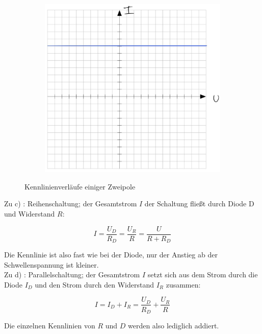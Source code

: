 \begin{figure}[H]
\begin{subfigure}[b]{0.45\textwidth}
        \caption{}
        \label{fig:VA_C_e}
    \end{subfigure}
    \hfill
    \begin{subfigure}[b]{0.45\textwidth}
        \includegraphics[width=\textwidth]{Voraufgaben/Cf.jpg}
        \caption{}
        \label{fig:VA_C_f}
    \end{subfigure}
    \caption{Kennlinienverläufe einiger Zweipole}
\end{figure}



Zu c) : Reihenschaltung; der Gesamtstrom $I$ der Schaltung fließt durch Diode D und Widerstand $R$:

\[
I = \frac{U_D}{R_D} = \frac{U_R}{R} = \frac{U}{R + R_D}
\]

Die Kennlinie ist also fast wie bei der Diode, nur der Anstieg ab der Schwellenspannung ist kleiner.
\\

Zu d) : Parallelschaltung; der Gesamtstrom $I$ setzt sich aus dem Strom durch die Diode $I_D$ und den Strom durch den Widerstand $I_R$ zusammen:

\[
I = I_D + I_R = \frac{U_D}{R_D} + \frac{U_R}{R}
\]

Die einzelnen Kennlinien von $R$ und $D$ werden also lediglich addiert.


